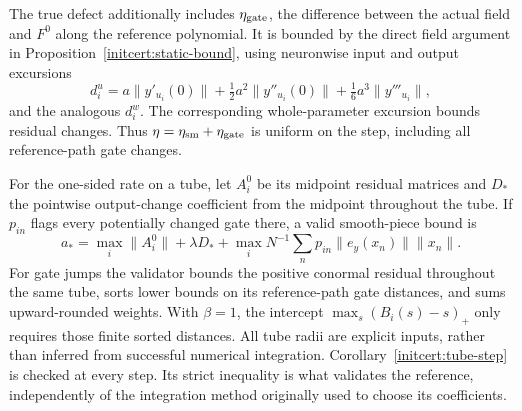 The true defect additionally includes $\eta_{\rm gate}$, the difference
between the actual field and $F^0$ along the reference polynomial.
It is bounded by the direct field argument in
Proposition~\ref{initcert:static-bound}, using neuronwise input and output excursions
\[
 d_i^u=a\|y'_{u_i}(0)\|+\tfrac12a^2\|y''_{u_i}(0)\|
                    +\tfrac16a^3\|y'''_{u_i}\|,
\]
and the analogous $d_i^w$. The corresponding whole-parameter excursion
bounds residual changes. Thus $\eta=\eta_{\rm sm}+\eta_{\rm gate}$ is
uniform on the step, including all reference-path gate changes.

For the one-sided rate on a tube, let $A_i^0$ be its midpoint residual
matrices and $D_*$ the pointwise output-change coefficient from the midpoint
throughout the tube. If $p_{in}$ flags every potentially changed gate there,
a valid smooth-piece bound is
\[
 a_* = \max_i\|A_i^0\|+\lambda D_*
       +\max_i N^{-1}\sum_n p_{in}\|e_y(x_n)\|\|x_n\|.
\]
For gate jumps the validator bounds the positive conormal residual throughout
the same tube, sorts lower bounds on its reference-path gate distances,
and sums upward-rounded weights. With $\beta=1$, the intercept
$\max_s(B_i(s)-s)_+$ only requires those finite sorted distances.
All tube radii are explicit inputs, rather than inferred from successful
numerical integration. Corollary~\ref{initcert:tube-step} is checked at every
step. Its strict inequality is what validates the reference, independently
of the integration method originally used to choose its coefficients.
